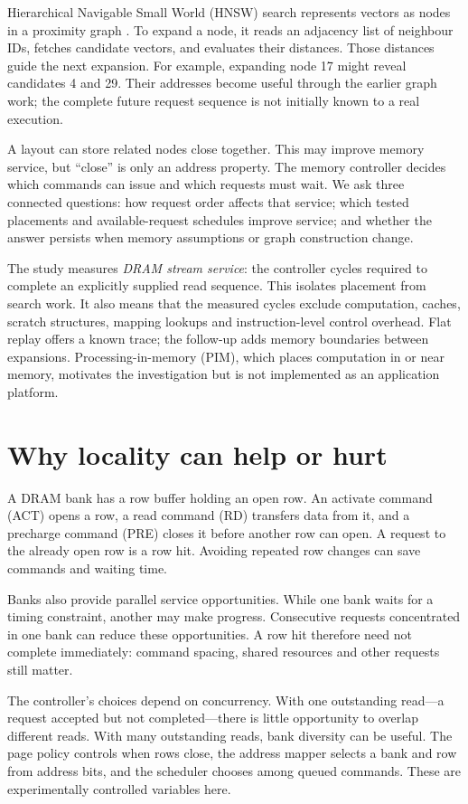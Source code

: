 \documentclass[conference]{IEEEtran}
\begin{document}
Hierarchical Navigable Small World (HNSW) search represents vectors as nodes in a proximity graph \cite{hnsw}. To expand a node, it reads an adjacency list of neighbour IDs, fetches candidate vectors, and evaluates their distances. Those distances guide the next expansion. For example, expanding node 17 might reveal candidates 4 and 29. Their addresses become useful through the earlier graph work; the complete future request sequence is not initially known to a real execution.

A layout can store related nodes close together. This may improve memory service, but ``close'' is only an address property. The memory controller decides which commands can issue and which requests must wait. We ask three connected questions: how request order affects that service; which tested placements and available-request schedules improve service; and whether the answer persists when memory assumptions or graph construction change.

The study measures \emph{DRAM stream service}: the controller cycles required to complete an explicitly supplied read sequence. This isolates placement from search work. It also means that the measured cycles exclude computation, caches, scratch structures, mapping lookups and instruction-level control overhead. Flat replay offers a known trace; the follow-up adds memory boundaries between expansions. Processing-in-memory (PIM), which places computation in or near memory, motivates the investigation but is not implemented as an application platform.

\section{Why locality can help or hurt}
A DRAM bank has a row buffer holding an open row. An activate command (ACT) opens a row, a read command (RD) transfers data from it, and a precharge command (PRE) closes it before another row can open. A request to the already open row is a row hit. Avoiding repeated row changes can save commands and waiting time.

Banks also provide parallel service opportunities. While one bank waits for a timing constraint, another may make progress. Consecutive requests concentrated in one bank can reduce these opportunities. A row hit therefore need not complete immediately: command spacing, shared resources and other requests still matter.

The controller's choices depend on concurrency. With one outstanding read---a request accepted but not completed---there is little opportunity to overlap different reads. With many outstanding reads, bank diversity can be useful. The page policy controls when rows close, the address mapper selects a bank and row from address bits, and the scheduler chooses among queued commands. These are experimentally controlled variables here.
\end{document}

